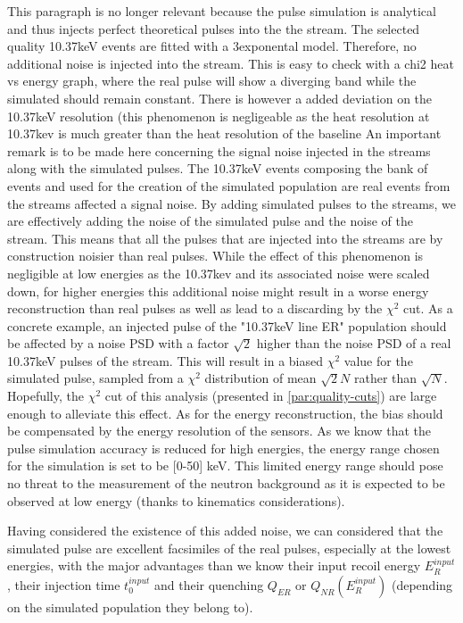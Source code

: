 {\color{red} This paragraph is no longer relevant because the pulse simulation is analytical and thus injects perfect theoretical pulses into the the stream. The selected quality 10.37keV events are fitted with a 3exponental model. Therefore, no additional noise is injected into the stream. This is easy to check with a chi2 heat vs energy graph, where the real pulse will show a diverging band while the simulated should remain constant. There is however a added deviation on the 10.37keV resolution (this phenomenon is negligeable as the heat resolution at 10.37kev is much greater than the heat resolution of the baseline}
An important remark is to be made here concerning the signal noise injected in the streams along with the simulated pulses. The 10.37keV events composing the bank of events and used for the creation of the simulated population are real events from the streams affected a signal noise. By adding simulated pulses to the streams, we are effectively adding the noise of the simulated pulse and the noise of the stream. This means that all the pulses that are injected into the streams are by construction noisier than real pulses.
While the effect of this phenomenon is negligible at low energies as the 10.37kev and its associated noise were scaled down, for higher energies this additional noise might result in a worse energy reconstruction than real pulses as well as lead to a discarding by the $\chi^2$ cut.
As a concrete example, an injected pulse of the "10.37keV line ER" population should be affected by a noise PSD with a factor $\sqrt{2}$ higher than the noise PSD of a real 10.37keV pulses of the stream. This will result in a biased $\chi^2$ value for the simulated pulse, sampled from a $\chi^2$ distribution of mean $\sqrt{2}N$ rather than $\sqrt{N}$. Hopefully, the $\chi^2$ cut of this analysis (presented in \ref{par:quality-cuts}) are large enough to alleviate this effect. As for the energy reconstruction, the bias should be compensated by the energy resolution of the sensors.
As we know that the pulse simulation accuracy is reduced for high energies, the energy range chosen for the simulation is set to be [0-50] keV. This limited energy range should pose no threat to the measurement of the neutron background as it is expected to be observed at low energy (thanks to kinematics considerations).

Having considered the existence of this added noise, we can considered that the simulated pulse are excellent facsimiles of the real pulses, especially at the lowest energies, with the major advantages than we know their input recoil energy $E_R^{input}$, their injection time $t_0^{input}$ and their quenching $Q_{ER}$ or $Q_{NR}(E_R^{input})$ (depending on the simulated population they belong to).



